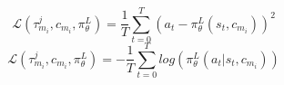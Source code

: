 
\begin{equation}
    \label{eq:mse}
    \mathcal{L}(\tau_{m_{i}}^{j}, c_{m_{i}},\pi^{L}_{\theta}) = \frac{1}{T}\sum_{t=0}^{T} (a_{t} - \pi^{L}_{\theta}(s_{t}, c_{m_{i}}))^{2}
\end{equation}
\begin{equation}
    \label{eq:nll}
    \mathcal{L}(\tau_{m_{i}}^{j}, c_{m_{i}},\pi^{L}_{\theta}) = - \frac{1}{T}\sum_{t=0}^{T} log(\pi^{L}_{\theta}(a_{t}|s_{t}, c_{m_{i}}))
\end{equation}